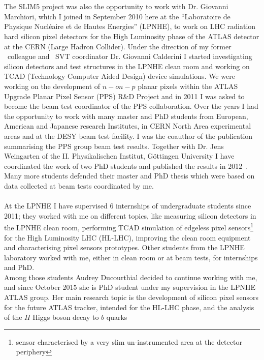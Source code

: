 \\
\\
The SLIM5 project was also the opportunity to work with Dr. Giovanni Marchiori, which I  joined in 
September 2010 here 
at the ``Laboratoire de Physique Nucl\'eaire et de Hautes Energies'' (LPNHE), to work on LHC
radiation hard silicon pixel detectors for the High Luminosity phase of the  ATLAS detector at the CERN  
(Large Hadron Collider). Under the direction of my former \babar\ colleague and \babar\ SVT coordinator
Dr. Giovanni Calderini I started investigating silicon detectors and test structures in the LPNHE clean room 
  and working on TCAD (Technology Computer Aided Design) device simulations.
We were working on the development of $n-on-p$ planar pixels within the ATLAS Upgrade Planar Pixel 
Sensor (PPS) R\&D Project and in 2011 I was asked to become the beam test coordinator of the PPS 
collaboration. Over the years I had the opportunity to work with many master and PhD students from
 European, American and Japanese research Institutes, in CERN North Area experimental areas and at the DESY 
 beam test facility. 
I was the coauthor of the publication summarising  the PPS group beam test 
results. Together with Dr. Jens Weingarten of the  II. Physikalischen Institut, G\"ottingen University 
I have coordinated the work of two PhD students and published the results in 2012~\cite{1748-0221-7-10-P10028}. \\
Many more students defended their master and PhD thesis which were based on data collected at 
beam tests coordinated by me.
\\ \\
At the LPNHE I have supervised  6 internships of undergraduate students since 2011; 
they worked with me on different topics, like measuring silicon detectors
 in the LPNHE clean room, performing TCAD 
simulation of edgeless pixel sensors\footnote{sensor characterised by a very slim un-instrumented area at 
the detector periphery}~\cite{bib:nim2012} for the 
High Luminosity LHC (HL-LHC), improving the clean room equipment  and characterising pixel sensors 
prototypes. Other students from the LPNHE laboratory worked with me, either
in clean room or at beam tests, for internships and PhD.
\\
Among those students Audrey Ducourthial decided to continue working with me, and since October 2015 she is 
 PhD student under my supervision in the LPNHE ATLAS group. 
Her main research topic is the development of silicon pixel sensors for the future ATLAS tracker, intended 
for the HL-LHC phase, and the analysis of the $H$ Higgs boson decay to $b$ quarks
